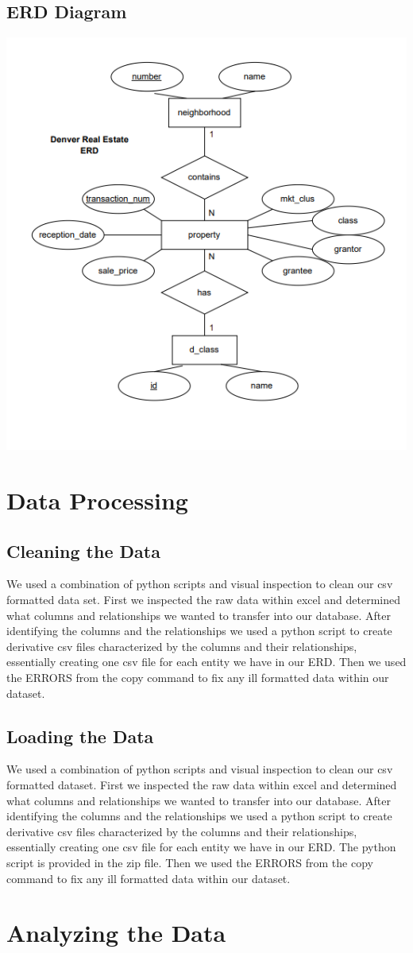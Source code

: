 \documentclass[]{article}
\begin{document}
\subsection{ERD Diagram}
\includegraphics{ERD}

\section{Data Processing}
\subsection{Cleaning the Data}
We used a combination of python scripts and visual inspection to clean our csv formatted data set. First we inspected the raw data within excel and determined what columns and relationships we wanted to transfer into our database. After identifying the columns and the relationships we used a python script to create derivative csv files characterized by the columns and their relationships, essentially creating one csv file for each entity we have in our ERD. Then we used the ERRORS from the copy command to fix any ill formatted data within our dataset. 

\subsection{Loading the Data}
We used a combination of python scripts and visual inspection to clean our csv formatted dataset. First we inspected the raw data within excel and determined what columns and relationships we wanted to transfer into our database. After identifying the columns and the relationships we used a python script to create derivative csv files characterized by the columns and their relationships, essentially creating one csv file for each entity we have in our ERD. The python script is provided in the zip file. Then we used the ERRORS from the copy command to fix any ill formatted data within our dataset. 

\section{Analyzing the Data}
\end{document}
